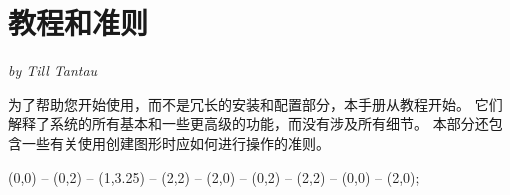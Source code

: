 

\part{教程和准则}

{\Large \emph{by Till Tantau}}

\bigskip


\noindent 为了帮助您开始使用\tikzname ，而不是冗长的安装和配置部分，本手册从教程开始。 它们解释了系统的所有基本和一些更高级的功能，而没有涉及所有细节。 本部分还包含一些有关使用\tikzname 创建图形时应如何进行操作的准则。

\vskip3cm

\begin{codeexample}[graphic=white,width=0pt]
\tikz \draw[thick,rounded corners=8pt]
  (0,0) -- (0,2) -- (1,3.25) -- (2,2) -- (2,0) -- (0,2) -- (2,2) -- (0,0) -- (2,0);
\end{codeexample}

\clearpage






